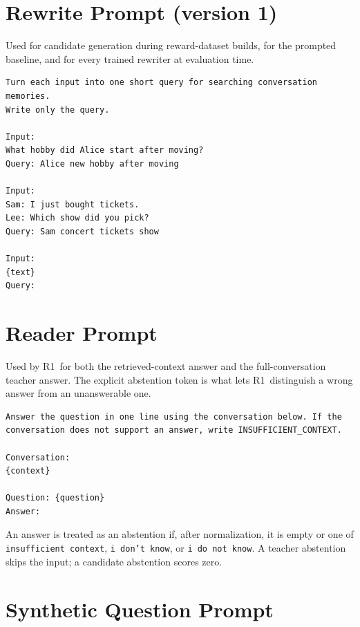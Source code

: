 \documentclass[12pt,letterpaper,oneside]{report}
\newcommand{\code}[1]{\texttt{\small #1}}
\newcommand{\Ra}{R1}
\begin{document}
\section{Rewrite Prompt (version 1)}

Used for candidate generation during reward-dataset builds, for the prompted
baseline, and for every trained rewriter at evaluation time.

\begin{singlespace}
\begin{lstlisting}
Turn each input into one short query for searching conversation memories.
Write only the query.

Input:
What hobby did Alice start after moving?
Query: Alice new hobby after moving

Input:
Sam: I just bought tickets.
Lee: Which show did you pick?
Query: Sam concert tickets show

Input:
{text}
Query:
\end{lstlisting}
\end{singlespace}

\section{Reader Prompt}

Used by \Ra\ for both the retrieved-context answer and the full-conversation
teacher answer. The explicit abstention token is what lets \Ra\ distinguish a
wrong answer from an unanswerable one.

\begin{singlespace}
\begin{lstlisting}
Answer the question in one line using the conversation below. If the
conversation does not support an answer, write INSUFFICIENT_CONTEXT.

Conversation:
{context}

Question: {question}
Answer:
\end{lstlisting}
\end{singlespace}

An answer is treated as an abstention if, after normalization, it is empty or
one of \code{insufficient context}, \code{i don't know}, or \code{i do not
know}. A teacher abstention skips the input; a candidate abstention scores
zero.

\section{Synthetic Question Prompt}
\end{document}
